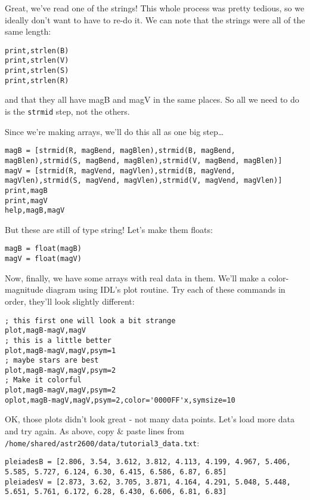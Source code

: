 \documentclass{article}
\begin{document}
\begin{spacing}{1.0}
Great, we've read one of the strings!  This whole process was pretty tedious, so we ideally
don't want to have to re-do it.  We can note that the strings were all of the same length:

\begin{lstlisting}
print,strlen(B)
print,strlen(V)
print,strlen(S)
print,strlen(R)
\end{lstlisting}

and that they all have magB and magV in the same places.  So all we need to do
is the \verb|strmid| step, not the others.

Since we're making arrays, we'll do this all as one big step\dots
\begin{lstlisting}[breaklines]
magB = [strmid(R, magBend, magBlen),strmid(B, magBend, magBlen),strmid(S, magBend, magBlen),strmid(V, magBend, magBlen)]
magV = [strmid(R, magVend, magVlen),strmid(B, magVend, magVlen),strmid(S, magVend, magVlen),strmid(V, magVend, magVlen)]
print,magB
print,magV
help,magB,magV
\end{lstlisting}

But these are still of type string!  Let's make them floats:

\begin{lstlisting}
magB = float(magB)
magV = float(magV)
\end{lstlisting}

Now, finally, we have some arrays with real data in them.  We'll make a
color-magnitude diagram using IDL's plot routine.  Try each of these commands in order,
they'll look slightly different:

\begin{lstlisting}
; this first one will look a bit strange
plot,magB-magV,magV
; this is a little better
plot,magB-magV,magV,psym=1
; maybe stars are best
plot,magB-magV,magV,psym=2
; Make it colorful
plot,magB-magV,magV,psym=2
oplot,magB-magV,magV,psym=2,color='0000FF'x,symsize=10
\end{lstlisting}

OK, those plots didn't look great - not many data points.  Let's load more data and try again.
As above, copy \& paste lines from \verb|/home/shared/astr2600/data/tutorial3_data.txt|:

\begin{lstlisting}[breaklines]
pleiadesB = [2.806, 3.54, 3.612, 3.812, 4.113, 4.199, 4.967, 5.406, 5.585, 5.727, 6.124, 6.30, 6.415, 6.586, 6.87, 6.85]
pleiadesV = [2.873, 3.62, 3.705, 3.871, 4.164, 4.291, 5.048, 5.448, 5.651, 5.761, 6.172, 6.28, 6.430, 6.606, 6.81, 6.83]
\end{lstlisting}


\end{spacing}
\end{document}
